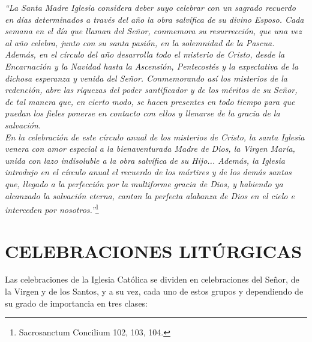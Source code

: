 \documentclass[letterpaper, 12pt]{book}
\begin{document}
    \textit{``La Santa Madre Iglesia considera deber suyo celebrar con un sagrado recuerdo en d\'ias determinados a trav\'es del a\~no la obra salv\'ifica de su divino Esposo. Cada semana en el d\'ia que llaman del Se\~nor, conmemora su resurrecci\'on, que una vez al a\~no celebra, junto con su santa pasi\'on, en la solemnidad de la Pascua. Adem\'as, en el círculo del a\~no desarrolla todo el misterio de Cristo, desde la Encarnaci\'on y la Navidad hasta la Ascensi\'on, Pentecost\'es y la expectativa de la dichosa esperanza y venida del Se\~nor. Conmemorando as\'i los misterios de la redenci\'on, abre las riquezas del poder santificador y de los m\'eritos de su Se\~nor, de tal manera que, en cierto modo, se hacen presentes en todo tiempo para que puedan los fieles ponerse en contacto con ellos y llenarse de la gracia de la salvaci\'on.\\
    En la celebraci\'on de este c\'irculo anual de los misterios de Cristo, la santa Iglesia venera con amor especial a la bienaventurada Madre de Dios, la Virgen Mar\'ia, unida con lazo indisoluble a la obra salv\'ifica de su Hijo... Adem\'as, la Iglesia introdujo en el c\'irculo anual el recuerdo de los m\'artires y de los dem\'as santos que, llegado a la perfecci\'on por la multiforme gracia de Dios, y habiendo ya alcanzado la salvaci\'on eterna, cantan la perfecta alabanza de Dios en el cielo e interceden por nosotros.''}\footnote{Sacrosanctum Concilium 102, 103, 104.}
    
    \chapter{CELEBRACIONES LIT\'URGICAS}
    Las celebraciones de la Iglesia Cat\'olica se dividen en celebraciones del Se\~nor, de la Virgen y de los Santos, y a su vez, cada uno de estos grupos y dependiendo de su grado de importancia en tres clases:
    
\end{document}
